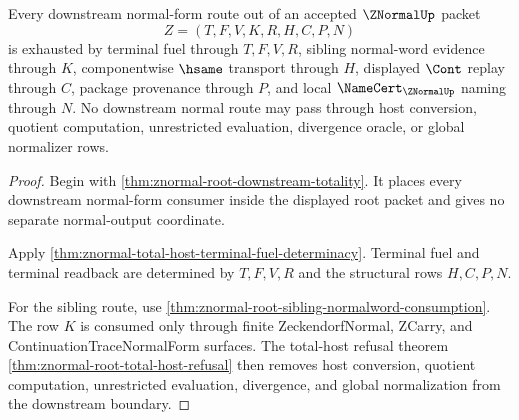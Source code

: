 \begin{theorem}
\label{thm:znormal-downstream-normal-route-exhaustion}
Every downstream normal-form route out of an accepted $\ZNormalUp$ packet
$$
Z=(T,F,V,K,R,H,C,P,N)
$$
is exhausted by terminal fuel through $T,F,V,R$, sibling normal-word evidence through $K$, componentwise $\hsame$ transport through $H$, displayed $\Cont$ replay through $C$, package provenance through $P$, and local $\NameCert_{\ZNormalUp}$ naming through $N$. No downstream normal route may pass through host conversion, quotient computation, unrestricted evaluation, divergence oracle, or global normalizer rows.
\end{theorem}
\begin{proof}
Begin with \autoref{thm:znormal-root-downstream-totality}. It places every downstream normal-form consumer inside the displayed root packet and gives no separate normal-output coordinate.

Apply \autoref{thm:znormal-total-host-terminal-fuel-determinacy}. Terminal fuel and terminal readback are determined by $T,F,V,R$ and the structural rows $H,C,P,N$.

For the sibling route, use \autoref{thm:znormal-root-sibling-normalword-consumption}. The row $K$ is consumed only through finite ZeckendorfNormal, ZCarry, and ContinuationTraceNormalForm surfaces. The total-host refusal theorem \autoref{thm:znormal-root-total-host-refusal} then removes host conversion, quotient computation, unrestricted evaluation, divergence, and global normalization from the downstream boundary.
\end{proof}

